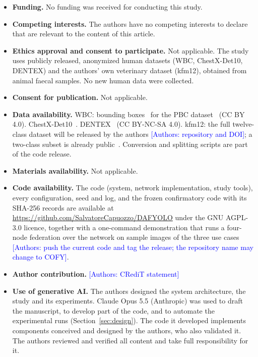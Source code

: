 \documentclass[pdflatex,sn-mathphys-num]{sn-jnl}
\newcommand{\authornote}[1]{\textcolor{blue}{[Authors: #1]}}
\begin{document}
\begin{itemize}
\item \textbf{Funding.} No funding was received for conducting this study.
\item \textbf{Competing interests.} The authors have no competing interests to declare that are relevant to the content of this article.
\item \textbf{Ethics approval and consent to participate.} Not applicable. The study uses publicly released, anonymized human datasets (WBC, ChestX-Det10, DENTEX) and the authors' own veterinary dataset (kfm12), obtained from animal faecal samples. No new human data were collected.
\item \textbf{Consent for publication.} Not applicable.
\item \textbf{Data availability.} WBC: bounding boxes~\cite{wbcdetection} for the PBC dataset~\cite{acevedo2020pbc} (CC BY 4.0). ChestX-Det10~\cite{liu2020chestxdet10}. DENTEX~\cite{hamamci2023dentex} (CC BY-NC-SA 4.0). kfm12: the full twelve-class dataset will be released by the authors \authornote{repository and DOI}; a two-class subset is already public~\cite{capuozzo2025trematodes}. Conversion and splitting scripts are part of the code release.
\item \textbf{Materials availability.} Not applicable.
\item \textbf{Code availability.} The code (system, network implementation, study tools), every configuration, seed and log, and the frozen confirmatory code with its SHA-256 records are available at \url{https://github.com/SalvatoreCapuozzo/DAFYOLO} under the GNU AGPL-3.0 licence, together with a one-command demonstration that runs a four-node federation over the network on sample images of the three use cases \authornote{push the current code and tag the release; the repository name may change to COFY}.
\item \textbf{Author contribution.} \authornote{CRediT statement}
\item \textbf{Use of generative AI.} The authors designed the system architecture, the study and its experiments. Claude Opus 5.5 (Anthropic) was used to draft the manuscript, to develop part of the code, and to automate the experimental runs (Section~\ref{sec:design}). The code it developed implements components conceived and designed by the authors, who also validated it. The authors reviewed and verified all content and take full responsibility for it.
\end{itemize}
\end{document}
